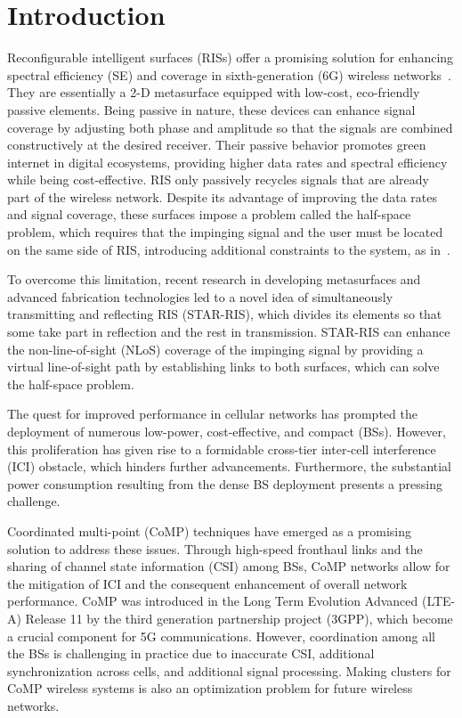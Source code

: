 \documentclass[conference]{IEEEtran}
\begin{document}
\section{Introduction}
Reconfigurable intelligent surfaces (RISs) offer a promising solution for enhancing spectral efficiency (SE) and coverage in sixth-generation (6G) wireless networks~\cite{wu2019towards, di2020smart}. They are essentially a 2-D metasurface equipped with low-cost, eco-friendly passive elements. Being passive in nature, these devices can enhance signal coverage by adjusting both phase and amplitude so that the signals are combined constructively at the desired receiver. Their passive behavior promotes green internet in digital ecosystems, providing higher data rates and spectral efficiency while being cost-effective. RIS only passively recycles signals that are already part of the wireless network. Despite its advantage of improving the data rates and signal coverage, these surfaces impose a problem called the half-space problem, which requires that the impinging signal and the user must be located on the same side of RIS, introducing additional constraints to the system, as in~\cite{hou2021joint}.

To overcome this limitation, recent research in developing metasurfaces and advanced fabrication technologies led to a novel idea of simultaneously transmitting and reflecting RIS (STAR-RIS), which divides its elements so that some take part in reflection and the rest in transmission. STAR-RIS can enhance the non-line-of-sight (NLoS) coverage of the impinging signal by providing a virtual line-of-sight path by establishing links to both surfaces, which can solve the half-space problem.

The quest for improved performance in cellular networks has prompted the deployment of numerous low-power, cost-effective, and compact (BSs). However, this proliferation has given rise to a formidable cross-tier inter-cell interference (ICI) obstacle, which hinders further advancements. Furthermore, the substantial power consumption resulting from the dense BS deployment presents a pressing challenge.

Coordinated multi-point (CoMP) techniques have emerged as a promising solution to address these issues. Through high-speed fronthaul links and the sharing of channel state information (CSI) among BSs, CoMP networks allow for the mitigation of ICI and the consequent enhancement of overall network performance. CoMP was introduced in the Long Term Evolution Advanced (LTE-A) Release 11 by the third generation partnership project (3GPP), which become a crucial component for 5G communications. However, coordination among all the BSs is challenging in practice due to inaccurate CSI, additional synchronization across cells, and additional signal processing. Making clusters for CoMP wireless systems is also an optimization problem for future wireless networks.
\end{document}
